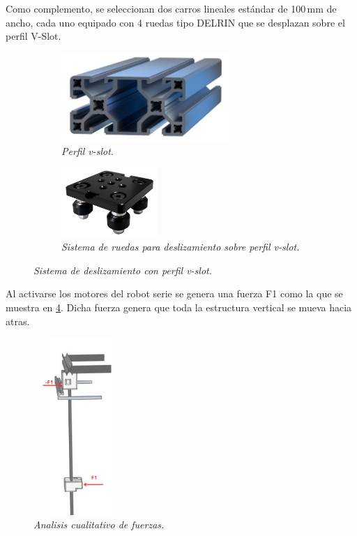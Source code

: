 Como complemento, se seleccionan dos carros lineales estándar de 100\,mm de ancho, cada uno equipado con 4 ruedas tipo DELRIN que se desplazan sobre el perfil V-Slot.
\begin{figure}[H]
    \centering
    \begin{subfigure}{0.35\textwidth}
        \centering
        \includegraphics[width=0.7\textwidth]{img/vslot_40x80.png}
        \caption{\textit{Perfil v-slot.}}
        \label{fig:vslot_40x80}
    \end{subfigure}
    \hspace{0.5cm}
    \begin{subfigure}{0.35\textwidth}
        \centering
        \includegraphics[width=0.4\textwidth]{img/carro_perfilvslot.png}
        \caption{\textit{Sistema de ruedas para deslizamiento sobre perfil v-slot.}}
        \label{fig:carro_perfilvslot}
    \end{subfigure}
    \caption{\textit{Sistema de deslizamiento con perfil v-slot.}}
\end{figure}
Al activarse los motores del robot serie se genera una fuerza F1 como la que se muestra en \ref{fig:esfuerzo_lateral}. Dicha fuerza genera que toda la estructura vertical se mueva hacia atras.
\begin{figure}[H]
        \centering
        \includegraphics[width=0.3\textwidth]{img/esfuerzo_lateral.png}
        \caption{\textit{Analisis cualitativo de fuerzas.}}
        \label{fig:esfuerzo_lateral}
\end{figure}
